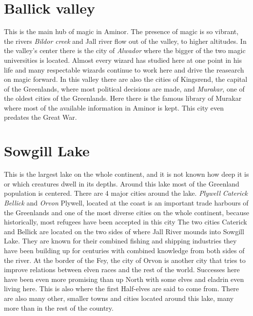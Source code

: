 \documentclass[oneside]{book}
\begin{document}
	\section{Ballick valley}
	This is the main hub of magic in Aminor. The presence of magic is so vibrant, the rivers \textit{Bildor creek} and Jall river flow out of the valley, to higher altitudes.
	In the valley's center there is the city of \textit{Alwador} where the bigger of the two magic universities is located.
	Almost every wizard has studied here at one point in his life and many respectable wizards continue to work here and drive the reasearch on magic forward.
	In this valley there are also the cities of Kingsrend, the capital of the Greenlands, where most political decisions are made,
	and \textit{Murakar}, one of the oldest cities of the Greenlands. Here there is the famous library of Murakar where most of the available information in Aminor is kept.
	This city even predates the Great War.
	
	\section{Sowgill Lake}
	This is the largest lake on the whole continent, and it is not known how deep it is or which creatures dwell in its depths.
	Around this lake most of the Greenland population is centered. There are 4 major cities around the lake.
	\textit{Plywell} \textit{Caterick} \textit{Bellick} and \textit{Orvon}
	Plywell, located at the coast is an important trade harbours of the Greenlands and one of the most diverse cities on the whole continent, because historically, most refugees have been accepted in this city
	The two cities Caterick and Bellick are located on the two sides of where Jall River mounds into Sowgill Lake.
	They are known for their combined fishing and shipping industries they have been building up for centuries with combined knowledge from both sides of the river.
	At the border of the Fey, the city of Orvon is another city that tries to improve relations between elven races and the rest of the world.
	Successes here have been even more promising than up North with some elves and eladrin even living here. This is also where the first Half-elves are said to come from.
	There are also many other, smaller towns and cities located around this lake, 	many more than in the rest of the country.
	
\end{document}
